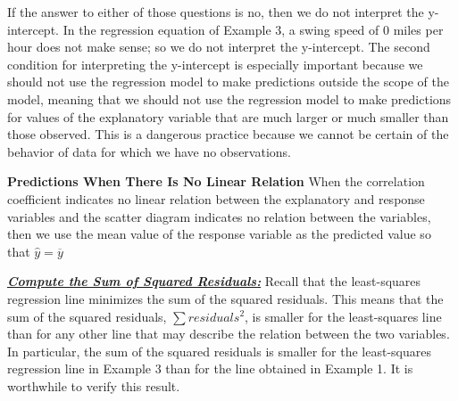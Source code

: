 \documentclass{report}
\begin{document}
    If the answer to either of those questions is no, then we do not interpret the y-intercept. In the regression equation of Example 3, a swing speed of 0 miles per hour does not make sense; so we do not interpret the y-intercept.
    \bigbreak \noindent 
    The second condition for interpreting the y-intercept is especially important because we should not use the regression model to make predictions outside the scope of the model, meaning that we should not use the regression model to make predictions for values of the explanatory variable that are much larger or much smaller than those observed. This is a dangerous practice because we cannot be certain of the behavior of data for which we have no observations.

    \bigbreak \noindent 
    \textbf{Predictions When There Is No Linear Relation}
    \bigbreak \noindent 
    When the correlation coefficient indicates no linear relation between the explanatory and response variables and the scatter diagram indicates no relation between the variables, then we use the mean value of the response variable as the predicted value so that $\hat{y}=\overline{y} $

    \pagebreak \bigbreak \noindent
    \textbf{\textit{\underline{Compute the Sum of Squared Residuals:}}}
    \bigbreak \noindent 
    Recall that the least-squares regression line minimizes the sum of the squared residuals. This means that the sum of the squared residuals, $\sum residuals^{2}$, is smaller for the least-squares line than for any other line that may describe the relation between the two variables. In particular, the sum of the squared residuals is smaller for the least-squares regression line in Example 3 than for the line obtained in Example 1. It is worthwhile to verify this result.

    \pagebreak \bigbreak \noindent
\end{document}
